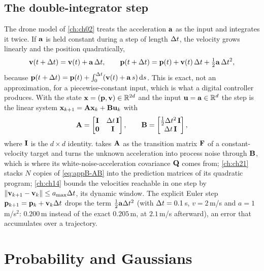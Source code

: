 \subsection{The double-integrator step}
\label{sec:appB-double-integrator}

The drone model of \cref{ch:ch02} treats the acceleration $\mathbf{a}$ as the input
and integrates it twice. If $\mathbf{a}$ is held constant during a step of length
$\Delta t$, the velocity grows linearly and the position quadratically,
\begin{equation}
  \mathbf{v}(t + \Delta t) = \mathbf{v}(t) + \mathbf{a}\,\Delta t,\qquad
  \mathbf{p}(t + \Delta t) = \mathbf{p}(t) + \mathbf{v}(t)\,\Delta t + \tfrac12\mathbf{a}\,\Delta t^2 ,
  \label{eq:appB-double-integrator}
\end{equation}
because $\mathbf{p}(t + \Delta t) = \mathbf{p}(t) + \int_0^{\Delta t}(\mathbf{v}(t) + \mathbf{a}\,s)\,\mathrm{d}s$.
This is exact, not an approximation, for a piecewise-constant input, which is
what a digital controller produces. With the state $\mathbf{x} = (\mathbf{p}, \mathbf{v}) \in
\mathbb{R}^{2d}$ and the input $\mathbf{u} = \mathbf{a} \in \mathbb{R}^d$ the step is the linear system
$\mathbf{x}_{k+1} = \mathbf{A}\mathbf{x}_k + \mathbf{B}\mathbf{u}_k$ with
\begin{equation}
  \mathbf{A} = \begin{bmatrix}\mathbf{I} & \Delta t\,\mathbf{I}\\ \mathbf{0} & \mathbf{I}\end{bmatrix},\qquad
  \mathbf{B} = \begin{bmatrix}\tfrac12\Delta t^2\,\mathbf{I}\\ \Delta t\,\mathbf{I}\end{bmatrix},
  \label{eq:appB-AB}
\end{equation}
where $\mathbf{I}$ is the $d \times d$ identity.
 takes $\mathbf{A}$ as the transition matrix $\mathbf{F}$ of a
constant-velocity target and turns the unknown acceleration into process noise
through $\mathbf{B}$, which is where its white-noise-acceleration covariance
$\mathbf{Q}$ comes from; \cref{ch:ch21} stacks $N$ copies of \cref{eq:appB-AB}
into the prediction matrices of its quadratic program; \cref{ch:ch14} bounds
the velocities reachable in one step by $\left\lVert \mathbf{v}_{k+1} - \mathbf{v}_k \right\rVert \le
a_{\max}\Delta t$, its dynamic window. The explicit Euler step $\mathbf{p}_{k+1} = \mathbf{p}_k + \mathbf{v}_k\Delta t$ drops the term $\tfrac12\mathbf{a}\Delta t^2$ (with $\Delta t = 0.1$\,s, $v = 2$\,m/s and $a = 1$\,m/s$^2$: $0.200$\,m instead of the exact $0.205$\,m, at $2.1$\,m/s afterward), an error that accumulates over a trajectory.

\section{Probability and Gaussians}
\label{sec:appB-probability}

